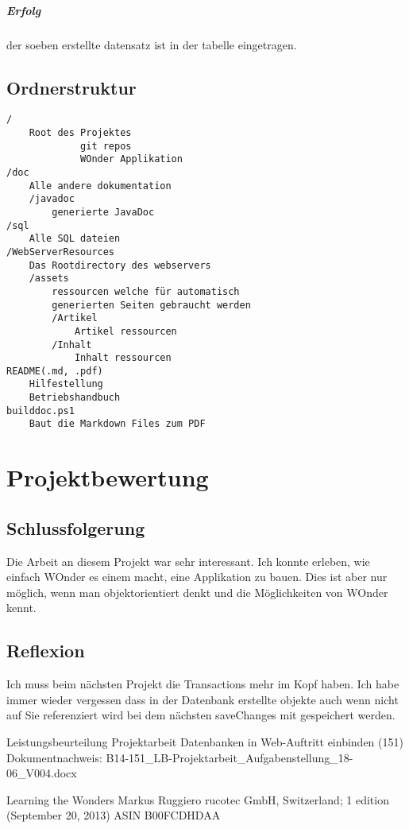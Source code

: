 \documentclass[a4paper, 11pt]{article}
\begin{document}
\subparagraph{Erfolg}

der soeben erstellte datensatz ist in der tabelle eingetragen.


\clearpage
\subsection{Ordnerstruktur}

\begin{verbatim}
/
    Root des Projektes
             git repos
             WOnder Applikation
/doc
    Alle andere dokumentation
    /javadoc
        generierte JavaDoc
/sql
    Alle SQL dateien
/WebServerResources
    Das Rootdirectory des webservers
    /assets
        ressourcen welche für automatisch
        generierten Seiten gebraucht werden
        /Artikel
            Artikel ressourcen
        /Inhalt
            Inhalt ressourcen
README(.md, .pdf)
	Hilfestellung
	Betriebshandbuch
builddoc.ps1
	Baut die Markdown Files zum PDF
\end{verbatim}

\section{Projektbewertung}

\subsection{Schlussfolgerung}

Die Arbeit an diesem Projekt war sehr interessant. Ich konnte erleben, wie einfach WOnder es einem macht, eine Applikation zu bauen. Dies ist aber nur möglich, wenn man objektorientiert denkt und die Möglichkeiten von WOnder kennt.

\subsection{Reflexion}

Ich muss beim nächsten Projekt die Transactions mehr im Kopf haben. Ich habe immer wieder vergessen dass in der Datenbank erstellte objekte auch wenn nicht auf Sie referenziert wird bei dem nächsten saveChanges mit gespeichert werden.

\begin{thebibliography}{9}
Leistungsbeurteilung Projektarbeit
Datenbanken in Web-Auftritt einbinden (151)
Dokumentnachweis: B14-151\_LB-Projektarbeit\_Aufgabenstellung\_18-06\_V004.docx

Learning the Wonders
Markus Ruggiero
rucotec GmbH, Switzerland; 1 edition (September 20, 2013)
ASIN B00FCDHDAA

\end{thebibliography}
\end{document}
